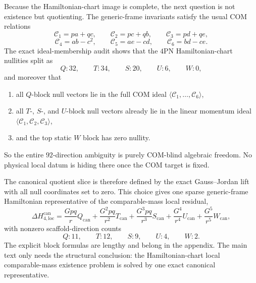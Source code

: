 \documentclass[11pt]{article}
\begin{document}
Because the Hamiltonian-chart image is complete, the next question is not
existence but quotienting.  The generic-frame invariants satisfy the usual COM
relations
\begin{equation}
\mathcal C_1 = pa+qc,
\qquad
\mathcal C_2 = pc+qb,
\qquad
\mathcal C_3 = pd+qe,
\label{eq:4pn-local-com-ideal-linear}
\end{equation}
\begin{equation}
\mathcal C_4 = ab-c^2,
\qquad
\mathcal C_5 = ae-cd,
\qquad
\mathcal C_6 = bd-ce.
\label{eq:4pn-local-com-ideal-quadratic}
\end{equation}
The exact ideal-membership audit shows that the $4$PN Hamiltonian-chart nullities
split as
\begin{equation}
Q:32,
\qquad
T:34,
\qquad
S:20,
\qquad
U:6,
\qquad
W:0,
\label{eq:4pn-local-nullities-by-block}
\end{equation}
and moreover that
\begin{enumerate}
  \item all $Q$-block null vectors lie in the full COM ideal
  $\langle \mathcal C_1,\ldots,\mathcal C_6\rangle$,
  \item all $T$-, $S$-, and $U$-block null vectors already lie in the linear
  momentum ideal $\langle \mathcal C_1,\mathcal C_2,\mathcal C_3\rangle$,
  \item and the top static $W$ block has zero nullity.
\end{enumerate}
So the entire $92$-direction ambiguity is purely COM-blind algebraic freedom.
No physical local datum is hiding there once the COM target is fixed.

The canonical quotient slice is therefore defined by the exact Gauss--Jordan lift
with all null coordinates set to zero.  This choice gives one sparse generic-frame
Hamiltonian representative of the comparable-mass local residual,
\begin{equation}
\Delta H_{4,\mathrm{loc}}^{\mathrm{can}}
=
\frac{Gpq}{r}Q_{\mathrm{can}}
+
\frac{G^2pq}{r^2}T_{\mathrm{can}}
+
\frac{G^3pq}{r^3}S_{\mathrm{can}}
+
\frac{G^4}{r^4}U_{\mathrm{can}}
+
\frac{G^5}{r^5}W_{\mathrm{can}},
\label{eq:4pn-canonical-hamiltonian-residual}
\end{equation}
with nonzero scaffold-direction counts
\begin{equation}
Q:11,
\qquad
T:12,
\qquad
S:9,
\qquad
U:4,
\qquad
W:2.
\label{eq:4pn-canonical-hamiltonian-sparsity}
\end{equation}
The explicit block formulas are lengthy and belong in the appendix.  The main
text only needs the structural conclusion: the Hamiltonian-chart local
comparable-mass existence problem is solved by one exact canonical
representative.
\end{document}
